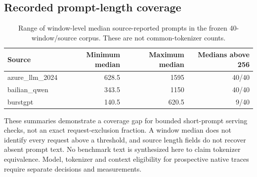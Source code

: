 \subsection{Recorded prompt-length coverage}
\begin{table}[t]\centering
\caption{Range of window-level median source-reported prompts in the
frozen 40-window/source corpus. These are not common-tokenizer counts.}
\label{tab:prompt-coverage}
\begin{tabular}{lrrr}\toprule
Source & Minimum median & Maximum median & Medians above 256\\\midrule
azure\_llm\_2024 & 628.5 & 1595 & 40/40\\
bailian\_qwen & 343.5 & 1150 & 40/40\\
burstgpt & 140.5 & 620.5 & 9/40\\
\bottomrule\end{tabular}\end{table}
These summaries demonstrate a coverage gap for bounded short-prompt
serving checks, not an exact request-exclusion fraction. A window median
does not identify every request above a threshold, and source length
fields do not recover absent prompt text. No benchmark text is synthesized
here to claim tokenizer equivalence. Model, tokenizer and context eligibility
for prospective native traces require separate decisions and measurements.
